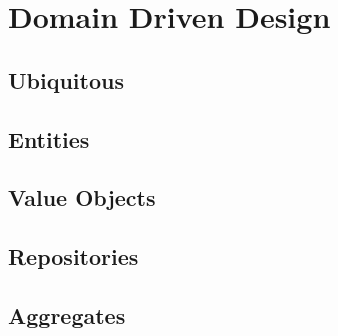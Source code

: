 \chapter{Domain Driven Design}
\section{Ubiquitous}
\section{Entities}
\section{Value Objects}
\section{Repositories}
\section{Aggregates}